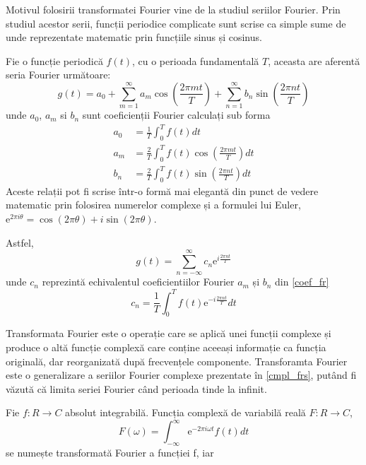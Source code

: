 \documentclass[a4paper,12pt]{book}
\begin{document}
			Motivul folosirii transformatei Fourier vine de la studiul seriilor Fourier. Prin studiul acestor serii, funcții periodice complicate sunt scrise ca simple sume de unde reprezentate matematic prin funcțiile sinus și cosinus.\par
			
			Fie o funcție periodică $f(t)$, cu o perioada fundamentală $T$, aceasta are aferentă seria Fourier următoare:
			\begin{equation}
				g(t) = a_0 + \sum_{m=1}^{\infty} a_m \cos(\frac{2\pi m t}{T}) + \sum_{n=1}^{\infty} b_n \sin(\frac{2\pi n t}{T})
			\end{equation}			
			unde $a_0$, $a_m$ si $b_n$ sunt coeficienții Fourier calculați sub forma			 
			\begin{align}
			\nonumber 	a_0 &= \frac{1}{T} \int_{0}^{T} f(t) dt\\
			\nonumber 	a_m &= \frac{2}{T} \int_{0}^{T} f(t) \cos(\frac{2 \pi m t}{T}) dt \\ 
						b_n &= \frac{2}{T} \int_{0}^{T} f(t) \sin(\frac{2 \pi n t}{T}) dt \label{coef_fr}
			\end{align}
			Aceste relații pot fi scrise într-o formă mai elegantă din punct de vedere matematic prin folosirea numerelor complexe și a formulei lui Euler, \(\mathrm{e}^{2\pi i\theta} = \cos (2\pi \theta) + i \sin (2\pi \theta)\).	\par
			Astfel, 
			\begin{equation} \label{cmpl_frs}
				g(t) = \sum_{n=-\infty}^{\infty} c_n  \mathrm{e}^{i \frac{2\pi n t}{T}} 
			\end{equation}
			unde $c_n$ reprezintă echivalentul coeficientiilor Fourier $a_m$ și $b_n$ din \ref{coef_fr}			
			\begin{equation*}
			 	c_n = \frac{1}{T} \int_{0}^{T} f(t) \mathrm{e}^{-i \frac{2\pi n t}{T}} dt
			\end{equation*}
			
			Transformata Fourier este o operație care se aplică unei funcții complexe și produce o altă funcție complexă care conține aceeași informație ca funcția originală, dar reorganizată după frecvențele componente. Transforamta Fourier este o generalizare a seriilor Fourier complexe prezentate în \ref{cmpl_frs}, putând fi văzută că limita seriei Fourier când perioada tinde la infinit.
			
			Fie $f : R \to C$ absolut integrabilă. Funcția complexă de variabilă reală	$F : R \to C$,
			\begin{equation*}
						F(\omega) = \int_{-\infty}^{\infty}  \mathrm{e}^{-2\pi i\omega t} f(t) dt
			\end{equation*}
				se numește transformată Fourier a funcției f, iar
			
\end{document}
